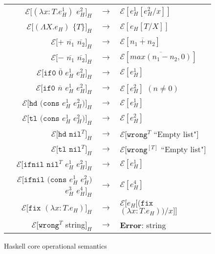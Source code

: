 \begin{figure}[p]
\label{hcos}
\caption{Haskell core operational semantics}
\begin{center}
\begin{tabular}{rcl}
$\mathscr{E}[(\lambda x:T.e_{H}^{1})$ $e_{H}^{2}]_{H}$ & $\rightarrow$ & $\mathscr{E}[e_{H}^{1}[e_{H}^{2}/x]]$ \\
$\mathscr{E}[(\Lambda X.e_{H})$ $\lbrace T\rbrace]_{H}$ & $\rightarrow$ & $\mathscr{E}[e_{H}[T/X]]$ \\
$\mathscr{E}[+$ $\overline{n_{1}}$ $\overline{n_{2}}]_{H}$ & $\rightarrow$ & $\mathscr{E}[\overline{n_{1}+n_{2}}]$ \\
$\mathscr{E}[-$ $\overline{n_{1}}$ $\overline{n_{2}}]_{H}$ & $\rightarrow$ & $\mathscr{E}[\overline{max(n_{1}-n_{2},0)}]$ \\
$\mathscr{E}[\mathtt{if0}$ $\overline{0}$ $e_{H}^{1}$ $e_{H}^{2}]_{H}$ & $\rightarrow$ & $\mathscr{E}[e_{H}^{1}]$ \\
$\mathscr{E}[\mathtt{if0}$ $\overline{n}$ $e_{H}^{1}$ $e_{H}^{2}]_{H}$ & $\rightarrow$ & $\mathscr{E}[e_{H}^{2}]$ $(n\neq0)$ \\
$\mathscr{E}[\mathtt{hd}$ $(\mathtt{cons}$ $e_{H}^{1}$ $e_{H}^{2})]_{H}$ & $\rightarrow$ & $\mathscr{E}[e_{H}^{1}]$ \\
$\mathscr{E}[\mathtt{tl}$ $(\mathtt{cons}$ $e_{H}^{1}$ $e_{H}^{2})]_{H}$ & $\rightarrow$ & $\mathscr{E}[e_{H}^{2}]$ \\
$\mathscr{E}[\mathtt{hd}$ $\mathtt{nil}^{T}]_{H}$ & $\rightarrow$ & $\mathscr{E}[\mathtt{wrong}^{T}$ ``Empty list"$]$ \\
$\mathscr{E}[\mathtt{tl}$ $\mathtt{nil}^{T}]_{H}$ & $\rightarrow$ & $\mathscr{E}[\mathtt{wrong}^{[T]}$ ``Empty list"$]$ \\
$\mathscr{E}[\mathtt{ifnil}$ $\mathtt{nil}^{T}$ $e_{H}^{1}$ $e_{H}^{2}]_{H}$ & $\rightarrow$ & $\mathscr{E}[e_{H}^{1}]$ \\
$\mathscr{E}[\mathtt{ifnil}$ $(\mathtt{cons}$ $e_{H}^{1}$ $e_{H}^{2})$ $e_{H}^{3}$ $e_{H}^{4}]_{H}$ & $\rightarrow$ & $\mathscr{E}[e_{H}^{4}]$ \\
$\mathscr{E}[\mathtt{fix}$ $(\lambda x:T.e_{H})]_{H}$ & $\rightarrow$ & $\mathscr{E}[e_{H}[(\mathtt{fix}$ $(\lambda x:T.e_{H}))/x]]$ \\
$\mathscr{E}[\mathtt{wrong}^{T}$ string$]_{H}$ & $\rightarrow$ & \textbf{Error}: string
\end{tabular}
\end{center}
\end{figure}
